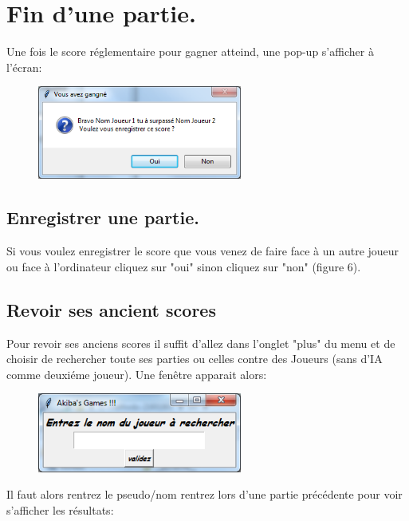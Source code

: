 \documentclass{article}
\begin{document}
\section{Fin d'une partie.}
Une fois le score réglementaire pour gagner atteind, une pop-up s'afficher à l'écran: 

\begin{figure}[!h]
\centerline{\includegraphics[width=0.6\textwidth]{images/pop-up_fin_partie.png}}
\vspace{0.5cm}
\caption{}
\end{figure}

\subsection{Enregistrer une partie.}
Si vous voulez enregistrer le score que vous venez de faire face à un autre joueur ou face à l'ordinateur cliquez sur "oui" sinon cliquez sur "non" (figure 6).
\subsection{Revoir ses ancient scores}
Pour revoir ses anciens scores il suffit d'allez dans l'onglet "plus" du menu et de choisir de rechercher toute ses parties ou celles contre des Joueurs (sans d'IA comme deuxiéme joueur). Une fenêtre apparait alors:

\begin{figure}[!h]
\centerline{\includegraphics[width=0.6\textwidth]{images/Saisie_Nom.png}}
\vspace{0.5cm}
\caption{}
\end{figure}

\newpage{}

Il faut alors rentrez le pseudo/nom rentrez lors d'une partie précédente pour voir s'afficher les résultats:
\end{document}
